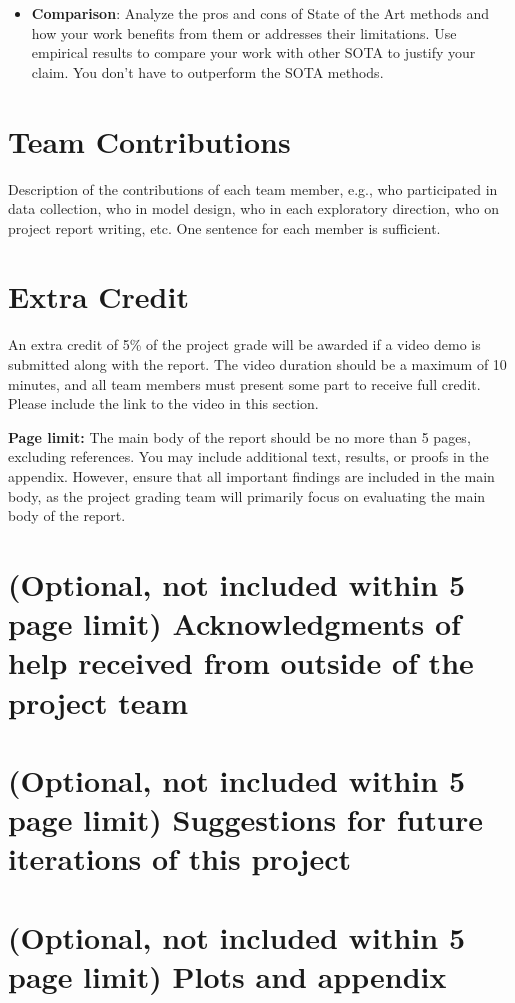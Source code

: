 \documentclass[10pt]{article}
\begin{document}
\begin{itemize}
\item \textbf{Comparison}: Analyze the pros and cons of State of the Art methods and how your work benefits from them or addresses their limitations. Use empirical results to compare your work with other SOTA to justify your claim. You don't have to outperform the SOTA methods.
\end{itemize}

\section{Team Contributions}
Description of the contributions of each team member, e.g., who participated in data collection, who in model design, who in each exploratory direction, who on project report writing, etc. One sentence for each member is sufficient.

\section{Extra Credit}
An extra credit of 5\% of the project grade will be awarded if a video demo is submitted along with the report. The video duration should be a maximum of 10 minutes, and all team members must present some part to receive full credit. Please include the link to the video in this section.

\vspace{3em}
\noindent
{\bf Page limit:} The main body of the report should be no more than 5 pages, excluding references. You may include additional text, results, or proofs in the appendix. However, ensure that all important findings are included in the main body, as the project grading team will primarily focus on evaluating the main body of the report.

\section{(Optional, not included within 5 page limit) Acknowledgments of help received from outside of the project team}

\section{(Optional, not included within 5 page limit) Suggestions for future iterations of this project}

\section{(Optional, not included within 5 page limit) Plots and appendix}
\end{document}
